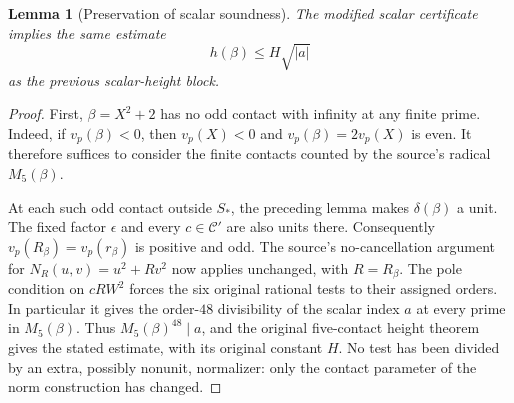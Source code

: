 \documentclass[11pt]{article}
\newtheorem{lemma}[theorem]{Lemma}
\theoremstyle{definition}
\begin{document}
\begin{lemma}[Preservation of scalar soundness]
\label{lem:normalized-scalar-soundness}
The modified scalar certificate implies the same estimate
\[
                      h(\beta)\le H\sqrt{|a|}
\]
as the previous scalar-height block.
\end{lemma}
\begin{proof}
First, $\beta=X^2+2$ has no odd contact with infinity at any finite
prime.  Indeed, if $v_p(\beta)<0$, then $v_p(X)<0$ and
$v_p(\beta)=2v_p(X)$ is even.  It therefore suffices to consider
the finite contacts counted by the source's radical $M_5(\beta)$.

At each such odd contact outside $S_*$, the preceding lemma makes
$\delta(\beta)$ a unit.  The fixed factor $\epsilon$ and every
$c\in\mathcal C'$ are also units there.  Consequently
$v_p(R_\beta)=v_p(r_\beta)$ is positive and odd.  The source's
no-cancellation argument for $N_R(u,v)=u^2+Rv^2$ now applies
unchanged, with $R=R_\beta$.  The pole condition on $cRW^2$ forces
the six original rational tests to their assigned orders.  In
particular it gives the order-$48$ divisibility of the scalar index
$a$ at every prime in $M_5(\beta)$.  Thus
$M_5(\beta)^{48}\mid a$, and the original five-contact height
theorem gives the stated estimate, with its original constant $H$.
No test has been divided by an extra, possibly nonunit, normalizer:
only the contact parameter of the norm construction has changed.
\end{proof}
\end{document}
